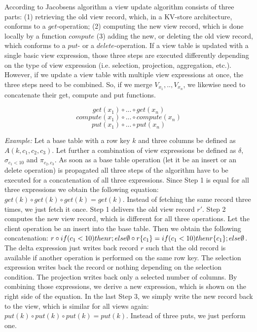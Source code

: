 According to Jacobsens 
algorithm a view update algorithm consists of three parts: (1) 
retrieving the old view record, which, in a KV-store architecture, 
conforms to a $get$-operation; (2) computing the new view record, which 
is done locally by a function $compute$ (3) adding the new, or deleting 
the old view record, which conforms to a $put$- or a $delete$-operation. 
If a view table is updated with a single basic view expression, those 
three steps are executed differently depending on the type of view 
expression (i.e. selection, projection, aggregation, etc.). However, if 
we update a view table with multiple view expressions at once, the three 
steps need to be combined. So, if we merge $V_{x_1},..,V_{x_n}$, we 
likewise need to concatenate their get, compute and put functions. 




\begin{equation} 	   
    get(x_1) \circ ... \circ get(x_n)
\end{equation}
\begin{equation} 	   
    compute(x_1) \circ ... \circ compute(x_n)
\end{equation}
\begin{equation} 	   
    put(x_1) \circ ... \circ put(x_n)
\end{equation}




\textit{Example:} Let a base table with a row key $k$ and three columns 
be defined as $A(k, c_1, c_2, c_3)$. Let further a combination of view 
expressions be defined as $\delta$, $\sigma_{c_1 < 10}$ and $\pi_{c_2, 
c_3}$. As soon as a base table operation (let it be an insert or an 
delete operation) is propagated all three steps of the algorithm have to 
be executed for a concatenation of all three expressions. Since Step 1 
is equal for all three expressions we obtain the following equation: 
$get(k) \circ get(k) \circ get(k)=get(k)$. Instead of fetching the same 
record three times, we just fetch it once. Step 1 delivers the old view 
record $r'$. Step 2 computes the new view record, which is different for 
all three operations. Let the client operation be an insert into the 
base table. Then we obtain the following concatenation: $r \circ if(c_1 
< 10)then r; else \emptyset \circ r\\\{c_1\}=if(c_1 < 10)then 
r\\\{c_1\}; else \emptyset$. The delta expression just writes back 
record $r$ such that the old record is available if another operation is 
performed on the same row key. The selection expression writes back the 
record or nothing depending on the selection condition. The projection 
writes back only a selected number of columns. By combining those 
expressions, we derive a new expression, which is shown on the right 
side of the equation. In the last Step 3, we simply write the new record
back to the view, which is similar for all views again: $put(k) \circ 
put(k) \circ put(k)=put(k)$. Instead of three puts, we just perform one.


